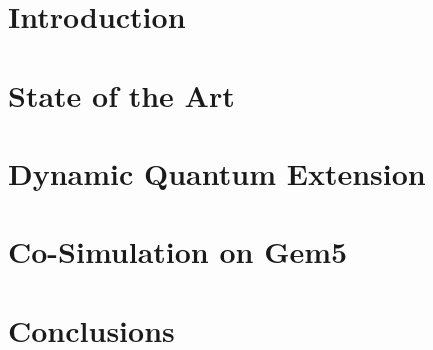 \documentclass[
	12pt, 
	english,
	oneside,
	onehalfspacing, %
	hidelinks,
    footinclude=true,
    headinclude=true
]{misc/MastersDoctoralThesis} %
\begin{document}
\mainmatter %
\pagestyle{thesis} %


\chapter{Introduction}
\label{cap:Intro}


\chapter{State of the Art}
\label{cap:SoA}



\chapter{Dynamic Quantum Extension}
\label{cap:DynamicQuantumExtension}


% 

\chapter{Co-Simulation on Gem5}
\label{cap:CaseOfStudy}



\chapter{Conclusions}
\label{cap:Conclusions}

\end{document}
